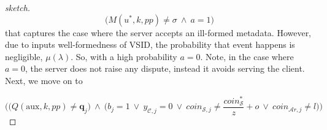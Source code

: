\begin{proof}[sketch]
  $$\Big(M(u^{\scriptscriptstyle *},k,{pp})\neq \sigma\ \wedge \ a=1\Big)$$
     that captures the case where the server accepts an ill-formed metadata. However, due to inputs well-formedness of VSID, the probability that event happens is negligible, $\mu(\lambda)$. So, with a high probability $a=0$.  Note, in the  case where $a=0$, the server does not raise any dispute, instead it avoids serving the client. Next, we move on to 
     
     $$\Bigg(\Big(Q(\text{aux},k,{pp})\neq \bm{q}_{\scriptscriptstyle j}\Big)\ \wedge \ \Big(b_{\scriptscriptstyle j}=1\ \vee \ y_{\scriptscriptstyle\mathcal{C},j}=0 \ \vee \ coin_{\scriptscriptstyle\mathcal{S},j}\neq \frac{coin_{\scriptscriptstyle\mathcal S}^{\scriptscriptstyle*}}{z}+o \ \vee \ coin_{\scriptscriptstyle\mathcal{A}r,j}\neq l\Big)\Bigg)$$
     

\end{proof}
